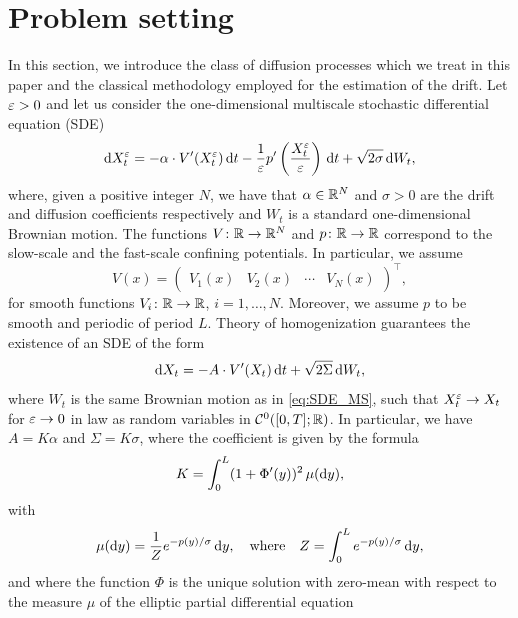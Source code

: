\documentclass[10pt]{article}
\begin{document}
\section{Problem setting}\label{sec:Setting}

In this section, we introduce the class of diffusion processes which we treat in this paper and the classical methodology employed for the estimation of the drift. Let $\varepsilon > 0$ and let us consider the one-dimensional multiscale stochastic differential equation (SDE)
\begin{equation}\label{eq:SDE_MS}
	\mathrm{d} X_t^\varepsilon = -\alpha \cdot V'(X_t^\varepsilon) \,\mathrm{d} t - \frac1{\varepsilon} p'\left(\frac{X_t^\varepsilon}{\varepsilon}\right) \,\mathrm{d} t + \sqrt{2\sigma} \,\mathrm{d} W_t,
\end{equation}
where, given a positive integer $N$, we have that $\alpha \in \mathbb{R}^N$ and $\sigma > 0$ are the drift and diffusion coefficients respectively and $W_t$ is a standard one-dimensional Brownian motion. The functions $V\colon \mathbb{R} \to \mathbb{R}^N$ and $p\colon \mathbb{R} \to \mathbb{R}$ correspond to the slow-scale and the fast-scale confining potentials. In particular, we assume 
\begin{equation}\label{eq:Potential}
	V(x) = \begin{pmatrix} V_1(x) & V_2(x) & \cdots & V_N(x) \end{pmatrix}^\top,
\end{equation}
for smooth functions $V_i\colon \mathbb{R} \to \mathbb{R}$, $i = 1, \ldots, N$. Moreover, we assume $p$ to be smooth and periodic of period $L$. Theory of homogenization \cite[Chapter 3]{BLP78} guarantees the existence of an SDE of the form
\begin{equation}\label{eq:SDE_HOM}
	\mathrm{d} X_t = - A \cdot V'(X_t) \,\mathrm{d} t + \sqrt{2\Sigma} \,\mathrm{d} W_t,
\end{equation}
where $W_t$ is the same Brownian motion as in \eqref{eq:SDE_MS}, such that $X_t^\varepsilon \to X_t$ for $\varepsilon\to 0$ in law as random variables in $\mathcal C^0([0, T]; \mathbb{R})$. In particular, we have $A = K\alpha$ and $\Sigma = K \sigma$, where the coefficient  is given by the formula
\begin{equation}\label{eq:K_HOM}
	K = \int_0^L (1 + \Phi'(y))^2 \, \mu(\mathrm{d} y),
\end{equation}
with 
\begin{equation}
	\mu(\mathrm{d} y) = \frac1Z e^{-p(y)/\sigma} \,\mathrm{d} y, \quad\text{where}\quad Z = \int_0^L e^{-p(y)/\sigma} \,\mathrm{d} y,
\end{equation}
and where the function $\Phi$ is the unique solution with zero-mean with respect to the measure $\mu$ of the elliptic partial differential equation
\end{document}
